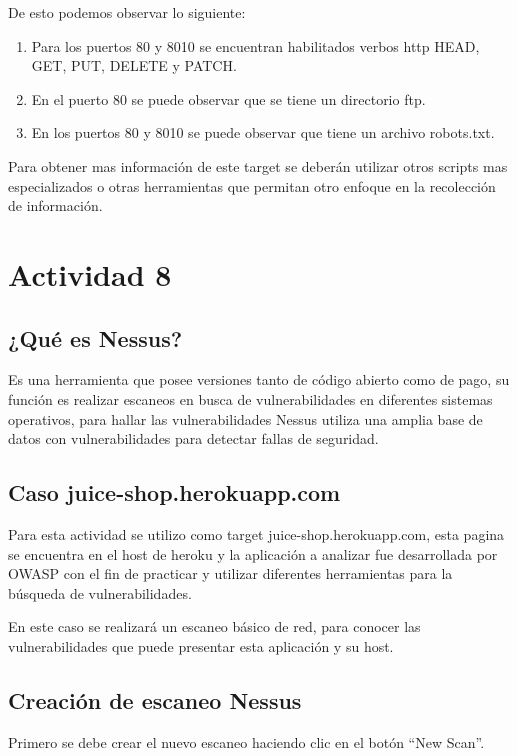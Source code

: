 \documentclass[stu, 11pt, letterpaper, donotrepeattitle, floatsintext, natbib]{apa7}
\begin{document}
De esto podemos observar lo siguiente:

\begin{enumerate}
  \item Para los puertos 80 y 8010 se encuentran habilitados verbos http HEAD, GET, PUT, DELETE y PATCH.
  \item En el puerto 80 se puede observar que se tiene un directorio ftp.
  \item En los puertos 80 y 8010 se puede observar que tiene un archivo robots.txt.
\end{enumerate}

Para obtener mas información de este target se deberán utilizar otros scripts mas especializados o otras herramientas que permitan otro enfoque en la recolección de información.

\newpage

\section{\large Actividad 8}

\subsection{¿Qué es Nessus?} 
Es una herramienta que posee versiones tanto de código abierto como de pago, su función es realizar escaneos en busca de vulnerabilidades en diferentes sistemas operativos, para hallar las vulnerabilidades Nessus utiliza una amplia base de datos con vulnerabilidades para detectar fallas de seguridad.

\subsection{Caso juice-shop.herokuapp.com} 
Para esta actividad se utilizo como target juice-shop.herokuapp.com, esta pagina se encuentra en el host de heroku y la aplicación a analizar fue desarrollada por OWASP con el fin de practicar y utilizar diferentes herramientas para la búsqueda de vulnerabilidades.

En este caso se realizará un escaneo básico de red, para conocer las vulnerabilidades que puede presentar esta aplicación y su host.

\subsection{Creación de escaneo Nessus } 
Primero se debe crear el nuevo escaneo haciendo clic en el botón “New Scan”.
\end{document}
